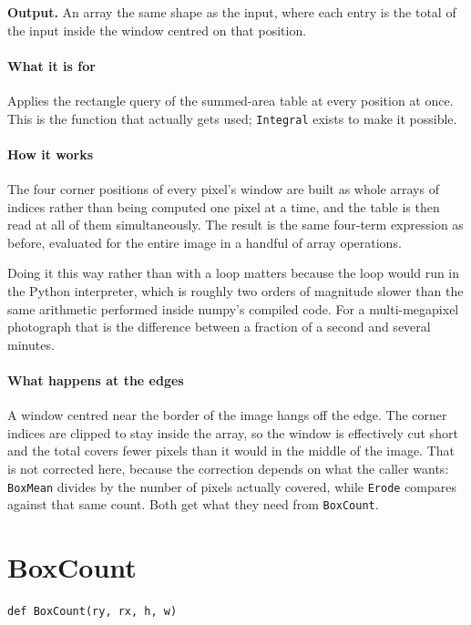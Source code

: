 \noindent\textbf{Output.} An array the same shape as the input, where each entry is the total of the input inside the window centred on that position.


\paragraph{What it is for}
Applies the rectangle query of the summed-area table at every position at once. This is the function that actually gets used; \texttt{Integral} exists to make it possible.


\paragraph{How it works}
The four corner positions of every pixel's window are built as whole arrays of indices rather than being computed one pixel at a time, and the table is then read at all of them simultaneously. The result is the same four-term expression as before, evaluated for the entire image in a handful of array operations.

Doing it this way rather than with a loop matters because the loop would run in the Python interpreter, which is roughly two orders of magnitude slower than the same arithmetic performed inside numpy's compiled code. For a multi-megapixel photograph that is the difference between a fraction of a second and several minutes.


\paragraph{What happens at the edges}
A window centred near the border of the image hangs off the edge. The corner indices are clipped to stay inside the array, so the window is effectively cut short and the total covers fewer pixels than it would in the middle of the image. That is not corrected here, because the correction depends on what the caller wants: \texttt{BoxMean} divides by the number of pixels actually covered, while \texttt{Erode} compares against that same count. Both get what they need from \texttt{BoxCount}.


\section{BoxCount}
\begin{lstlisting}[style=sig]
def BoxCount(ry, rx, h, w)
\end{lstlisting}

